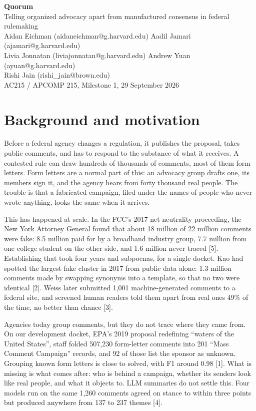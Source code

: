 \documentclass[11pt]{article}
\begin{document}
\begin{center}
{\LARGE\bfseries Quorum}\\[3pt]
{\large Telling organized advocacy apart from manufactured consensus in federal rulemaking}\\[6pt]
\small
Aidan Eichman (aidaneichman@g.harvard.edu) \textperiodcentered{}
Aadil Jamari (ajamari@g.harvard.edu)\\
Livia Jonnatan (liviajonnatan@g.harvard.edu) \textperiodcentered{}
Andrew Yuan (ayuan@g.harvard.edu)\\
Rishi Jain (rishi\_jain@brown.edu)\\[2pt]
AC215 / APCOMP 215, Milestone 1, 29 September 2026
\end{center}

\section{Background and motivation}

Before a federal agency changes a regulation, it publishes the proposal, takes public comments, and
has to respond to the substance of what it receives. A contested rule can draw hundreds of
thousands of comments, most of them form letters. Form letters are a normal part of this: an
advocacy group drafts one, its members sign it, and the agency hears from forty thousand real
people. The trouble is that a fabricated campaign, filed under the names of people who never wrote
anything, looks the same when it arrives.

This has happened at scale. In the FCC's 2017 net neutrality proceeding, the New York Attorney
General found that about 18 million of 22 million comments were fake: 8.5 million paid for by a
broadband industry group, 7.7 million from one college student on the other side, and 1.6 million
never traced [5]. Establishing that took four years and subpoenas, for a single docket. Kao had
spotted the largest fake cluster in 2017 from public data alone: 1.3 million comments made by
swapping synonyms into a template, so that no two were identical [2]. Weiss later submitted 1{,}001
machine-generated comments to a federal site, and screened human readers told them apart from real
ones 49\% of the time, no better than chance [3].

Agencies today group comments, but they do not trace where they came from. On our development
docket, EPA's 2019 proposal redefining ``waters of the United States'', staff folded 507{,}230
form-letter comments into 201 ``Mass Comment Campaign'' records, and 92 of those list the sponsor as
unknown. Grouping known form letters is close to solved, with F1 around 0.98 [1]. What is missing is
what comes after: who is behind a campaign, whether its senders look like real people, and what it
objects to. LLM summaries do not settle this. Four models run on the same
1{,}260 comments agreed on stance to within three points but produced anywhere from 137 to 237
themes [4].
\end{document}
